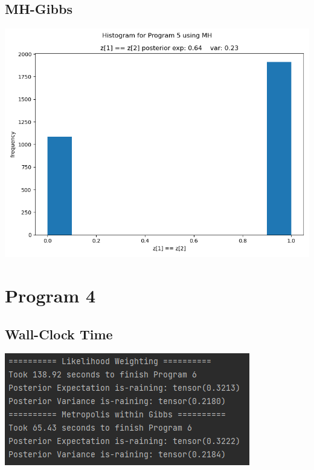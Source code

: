 \documentclass[10pt]{homeworg}
\begin{document}
\subsection{MH-Gibbs}
\begin{center}
\includegraphics[scale=0.5]{figures/MH_program_5.png}
\end{center}


\section{Program 4}
\subsection{Wall-Clock Time}
\begin{center}
\includegraphics{figures/program_4_time.png}
\end{center}
\end{document}
